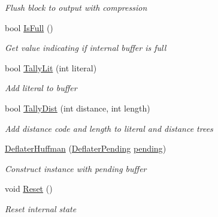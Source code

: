 \begin{DoxyCompactItemize}
\begin{DoxyCompactList}\small\item\em Flush block to output with compression \end{DoxyCompactList}\item 
bool \hyperlink{class_i_c_sharp_code_1_1_sharp_zip_lib_1_1_zip_1_1_compression_1_1_deflater_huffman_a6646ac225e009be1d5bf27f557c34116}{Is\+Full} ()
\begin{DoxyCompactList}\small\item\em Get value indicating if internal buffer is full \end{DoxyCompactList}\item 
bool \hyperlink{class_i_c_sharp_code_1_1_sharp_zip_lib_1_1_zip_1_1_compression_1_1_deflater_huffman_a444e33acca851e5312ef6d3596d93833}{Tally\+Lit} (int literal)
\begin{DoxyCompactList}\small\item\em Add literal to buffer \end{DoxyCompactList}\item 
bool \hyperlink{class_i_c_sharp_code_1_1_sharp_zip_lib_1_1_zip_1_1_compression_1_1_deflater_huffman_ac8edc6b7ea91fd984bd5d40a5839a692}{Tally\+Dist} (int distance, int length)
\begin{DoxyCompactList}\small\item\em Add distance code and length to literal and distance trees \end{DoxyCompactList}\item 
\hyperlink{class_i_c_sharp_code_1_1_sharp_zip_lib_1_1_zip_1_1_compression_1_1_deflater_huffman_a6acbaec44721ba72436a73ecc1e0ec29}{Deflater\+Huffman} (\hyperlink{class_i_c_sharp_code_1_1_sharp_zip_lib_1_1_zip_1_1_compression_1_1_deflater_pending}{Deflater\+Pending} \hyperlink{class_i_c_sharp_code_1_1_sharp_zip_lib_1_1_zip_1_1_compression_1_1_deflater_huffman_ab905a4997487a36bab2c23abefa1d50a}{pending})
\begin{DoxyCompactList}\small\item\em Construct instance with pending buffer \end{DoxyCompactList}\item 
void \hyperlink{class_i_c_sharp_code_1_1_sharp_zip_lib_1_1_zip_1_1_compression_1_1_deflater_huffman_a7a7f2daab9daea8c08f46b187a94202d}{Reset} ()
\begin{DoxyCompactList}\small\item\em Reset internal state \end{DoxyCompactList}\item 

\end{DoxyCompactItemize}
